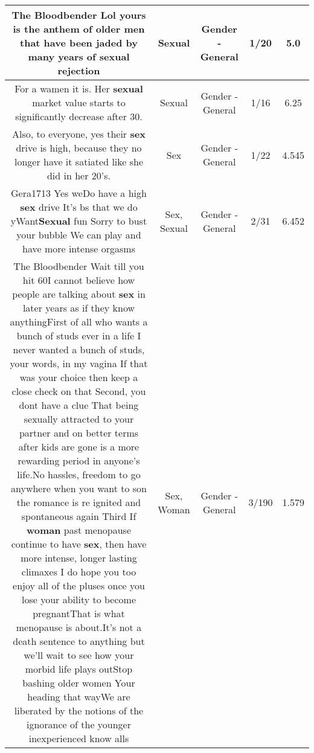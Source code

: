 \documentclass[11pt]{article}
\newlength\mylength
\begin{document}
\begin{center}
\begin{longtable}{|C{.65\mylength}|C{.30\mylength}|C{.12\mylength}|C{.12\mylength}|C{.12\mylength}|}
  \small The Bloodbender Lol yours is the anthem of older men that have been jaded by many years of \textbf{sexual} rejection\normalsize   & Sexual & Gender - General & 1/20 & 5.0 \\  \hline
  \small {} For a wamen it is. Her \textbf{sexual} market value starts to significantly decrease after 30.\normalsize   & Sexual & Gender - General & 1/16 & 6.25 \\  \hline
  \small Also, to everyone, yes their \textbf{sex} drive is high, because they no longer have it satiated like she did in her 20's.\normalsize   & Sex & Gender - General & 1/22 & 4.545 \\  \hline
  \small Gera1713 Yes weDo have a high \textbf{sex} drive It's bs that we do yWant\textbf{Sexual} fun Sorry to bust your bubble We can play and have more intense orgasms\normalsize   & Sex, Sexual & Gender - General & 2/31 & 6.452 \\  \hline
  \small The Bloodbender Wait till you hit 60I cannot believe how people are talking about \textbf{sex} in later years as if they know anythingFirst of all who wants a bunch of studs ever in a life I never wanted a bunch of studs, your words, in my vagina If that was your choice then keep a close check on that Second, you  dont have a clue That being sexually attracted to your partner and on better terms after kids are gone is a more rewarding period in anyone's life.No hassles, freedom to go anywhere when you want to son the romance is re ignited and spontaneous again Third If  \textbf{woman} past menopause continue to have \textbf{sex}, then have more intense, longer lasting climaxes    I do hope you too enjoy all of the pluses once you lose your ability to become pregnantThat is what menopause is about.It's not a death sentence to anything but we'll wait to see how your morbid life plays outStop bashing older women Your heading that wayWe are liberated by the notions of the ignorance of the younger inexperienced know alls\normalsize   & Sex, Woman & Gender - General & 3/190 & 1.579 \\  \hline

\end{longtable}
\end{center}
\end{document}
